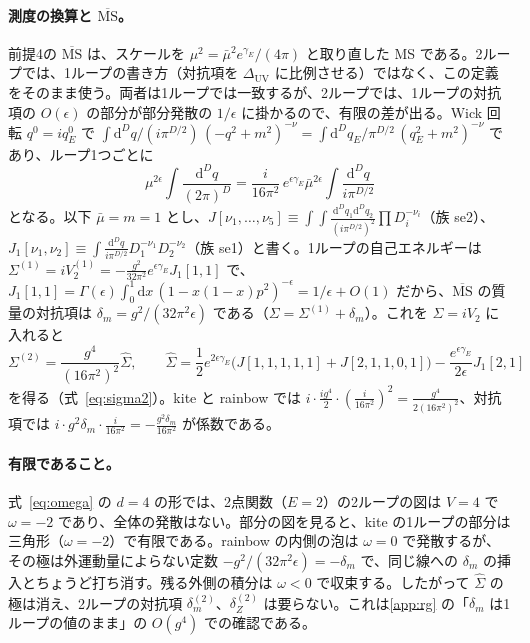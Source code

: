 \documentclass[a4paper,10pt]{ltjsarticle}
\newcommand{\dd}{\mathrm{d}}
\begin{document}
\paragraph{測度の換算と $\overline{\mathrm{MS}}$。}前提4の $\overline{\mathrm{MS}}$ は、スケールを $\mu^2=\bar\mu^2e^{\gamma_E}/(4\pi)$ と取り直した MS である。2ループでは、1ループの書き方（対抗項を $\Delta_{\mathrm{UV}}$ に比例させる）ではなく、この定義をそのまま使う。両者は1ループでは一致するが、2ループでは、1ループの対抗項の $O(\epsilon)$ の部分が部分発散の $1/\epsilon$ に掛かるので、有限の差が出る。Wick 回転 $q^0=iq_E^0$ で $\int\dd^Dq/(i\pi^{D/2})\,(-q^2+m^2)^{-\nu}=\int\dd^Dq_E/\pi^{D/2}\,(q_E^2+m^2)^{-\nu}$ であり、ループ1つごとに
\begin{equation*}
\mu^{2\epsilon}\int\frac{\dd^Dq}{(2\pi)^D}=\frac{i}{16\pi^2}\,e^{\epsilon\gamma_E}\bar\mu^{2\epsilon}\int\frac{\dd^Dq}{i\pi^{D/2}}
\end{equation*}
となる。以下 $\bar\mu=m=1$ とし、$J[\nu_1,\ldots,\nu_5]\equiv\int\!\!\int\frac{\dd^Dq_1\dd^Dq_2}{(i\pi^{D/2})^2}\prod D_i^{-\nu_i}$（族 se2）、$J_1[\nu_1,\nu_2]\equiv\int\frac{\dd^Dq}{i\pi^{D/2}}D_1^{-\nu_1}D_2^{-\nu_2}$（族 se1）と書く。1ループの自己エネルギーは $\Sigma^{(1)}=iV_2^{(1)}=-\frac{g^2}{32\pi^2}e^{\epsilon\gamma_E}J_1[1,1]$ で、$J_1[1,1]=\Gamma(\epsilon)\int_0^1\dd x\,(1-x(1-x)p^2)^{-\epsilon}=1/\epsilon+O(1)$ だから、$\overline{\mathrm{MS}}$ の質量の対抗項は $\delta_m=g^2/(32\pi^2\epsilon)$ である（$\Sigma=\Sigma^{(1)}+\delta_m$）。これを $\Sigma=iV_2$ に入れると
\begin{equation*}
\Sigma^{(2)}=\frac{g^4}{(16\pi^2)^2}\hat\Sigma,\qquad
\hat\Sigma=\frac12e^{2\epsilon\gamma_E}\bigl(J[1,1,1,1,1]+J[2,1,1,0,1]\bigr)-\frac{e^{\epsilon\gamma_E}}{2\epsilon}J_1[2,1]
\end{equation*}
を得る（式~\eqref{eq:sigma2}）。kite と rainbow では $i\cdot\frac{ig^4}{2}\cdot(\frac{i}{16\pi^2})^2=\frac{g^4}{2(16\pi^2)^2}$、対抗項では $i\cdot g^2\delta_m\cdot\frac{i}{16\pi^2}=-\frac{g^2\delta_m}{16\pi^2}$ が係数である。

\paragraph{有限であること。}式~\eqref{eq:omega} の $d=4$ の形では、2点関数（$E=2$）の2ループの図は $V=4$ で $\omega=-2$ であり、全体の発散はない。部分の図を見ると、kite の1ループの部分は三角形（$\omega=-2$）で有限である。rainbow の内側の泡は $\omega=0$ で発散するが、その極は外運動量によらない定数 $-g^2/(32\pi^2\epsilon)=-\delta_m$ で、同じ線への $\delta_m$ の挿入とちょうど打ち消す。残る外側の積分は $\omega<0$ で収束する。したがって $\hat\Sigma$ の極は消え、2ループの対抗項 $\delta_m^{(2)}$、$\delta_Z^{(2)}$ は要らない。これは\ref{app:rg} の「$\delta_m$ は1ループの値のまま」の $O(g^4)$ での確認である。
\end{document}
